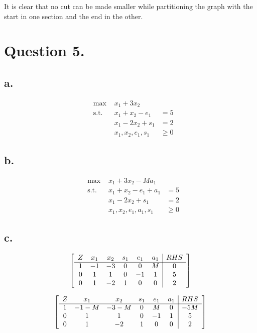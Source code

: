 \documentclass[10pt, letterpaper]{paper}
\begin{document}
It is clear that no cut can be made smaller while partitioning the graph with the start in one section and the end in the other. 


\section*{Question 5.}
\subsection*{a.}
\begin{equation*}
\begin{alignedat}{3}
&\text{max }&x_1 + 3x_2&\\
&\text{s.t. } &x_1 + x_2 - e_1 &= 5\\
& &x_1 - 2x_2 + s_1  &= 2\\
& &x_1, x_2, e_1, s_1 &\geq 0
\end{alignedat}
\end{equation*}

\subsection*{b.}
\begin{equation*}
\begin{alignedat}{3}
&\text{max }&x_1 + 3x_2 -Ma_1&\\
&\text{s.t. } &x_1 + x_2 - e_1 + a_1  &= 5\\
& &x_1 - 2x_2 + s_1  &= 2\\
& &x_1, x_2, e_1, a_1, s_1 &\geq 0
\end{alignedat}
\end{equation*}

\subsection*{c.}
\[
	\left[ {\begin{array}{cccccc|c}
	Z & x_1 & x_2 & s_1 & e_1 & a_1 & RHS\\ \cline{1-7}
	1 & -1 & -3 & 0 & 0 & M & 0 \\
	0 &1 & 1 & 0 & -1 & 1 & 5\\
	0 & 1 & -2 & 1 & 0 & 0 & 2\\
	\end{array} } \right]
\]

\[
	\left[ {\begin{array}{cccccc|c}
	Z & x_1 & x_2 & s_1 & e_1 & a_1 & RHS\\ \cline{1-7}
	1 & -1 - M & -3 - M & 0 & M & 0 & -5M \\
	0 &1 & 1 & 0 & -1 & 1 & 5\\
	0 & 1 & -2 & 1 & 0 & 0 & 2\\
	\end{array} } \right]
\]
\end{document}
